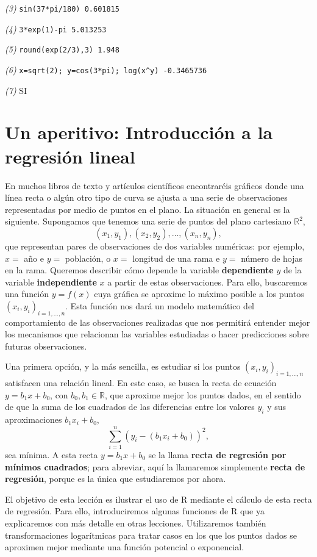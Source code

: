 \documentclass[
]{book}
\theoremstyle{definition}
\theoremstyle{definition}
\theoremstyle{definition}
\theoremstyle{remark}
\begin{document}
\emph{(3)} \texttt{sin(37*pi/180)\ 0.601815}

\emph{(4)} \texttt{3*exp(1)-pi\ 5.013253}

\emph{(5)} \texttt{round(exp(2/3),3)\ 1.948}

\emph{(6)} \texttt{x=sqrt(2);\ y=cos(3*pi);\ log(x\^{}y)\ -0.3465736}

\emph{(7)} SI

\hypertarget{chap:lm}{%
\chapter{Un aperitivo: Introducción a la regresión lineal}\label{chap:lm}}

En muchos libros de texto y artículos científicos encontraréis gráficos donde una línea recta o algún otro tipo de curva se ajusta a una serie de observaciones representadas por medio de puntos en el plano. La situación en general es la siguiente. Supongamos que tenemos una serie de puntos del plano cartesiano \(\mathbb{R}^2\),
\[
(x_1,y_1), (x_2,y_2),\ldots,(x_n,y_n),
\]
que representan pares de observaciones de dos variables numéricas: por ejemplo, \(x=\) año e \(y=\) población, o \(x=\) longitud de una rama e \(y=\) número de hojas en la rama. Queremos describir cómo depende la variable \textbf{dependiente} \(y\) de la variable \textbf{independiente} \(x\) a partir de estas observaciones. Para ello, buscaremos una función \(y=f(x)\) cuya gráfica se aproxime lo máximo posible a los puntos \((x_i,y_i)_{i=1,\ldots,n}\). Esta función nos dará un modelo matemático del comportamiento de las observaciones realizadas que nos permitirá entender mejor los mecanismos que relacionan las variables estudiadas o hacer predicciones sobre futuras observaciones.

Una primera opción, y la más sencilla, es estudiar si los puntos
\((x_i,y_i)_{i=1,\ldots,n}\) satisfacen una relación lineal. En este caso, se busca la recta de ecuación \(y=b_1x+b_0\), con \(b_0,b_1\in \mathbb{R}\), que aproxime mejor los puntos dados, en el sentido de que la suma
de los cuadrados de las diferencias entre los valores \(y_i\) y sus aproximaciones \(b_1x_i+b_0\),
\[
\sum_{i=1}^n (y_i-(b_1x_i+b_0))^2,
\]
sea mínima. A esta recta \(y=b_1x+b_0\) se la llama \textbf{recta de regresión por mínimos cuadrados}; para abreviar, aquí la llamaremos simplemente \textbf{recta de regresión}, porque es la única que estudiaremos por ahora.

El objetivo de esta lección es ilustrar el uso de R mediante el cálculo de esta recta de regresión. Para ello, introduciremos algunas funciones de R que ya explicaremos con más detalle en otras lecciones. Utilizaremos también transformaciones logarítmicas para tratar casos en los que los puntos dados se aproximen mejor mediante una función potencial o exponencial.
\end{document}
